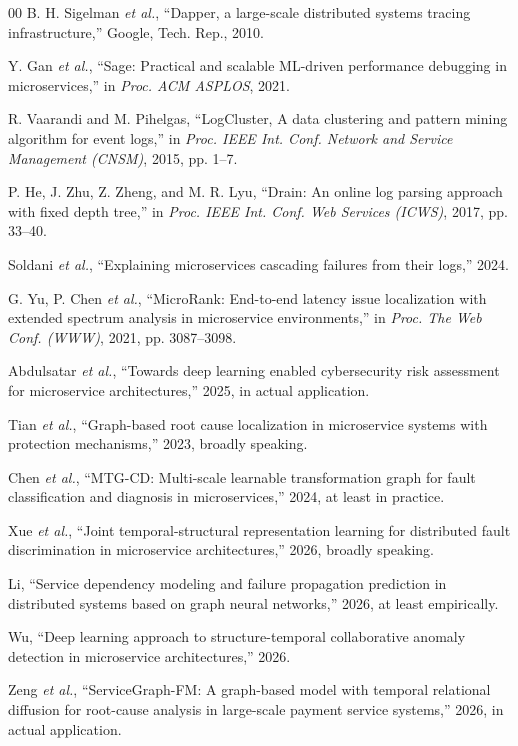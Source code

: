 \documentclass[conference]{IEEEtran}
\begin{document}
\begin{thebibliography}{00}
B. H. Sigelman \textit{et al.}, ``Dapper, a large-scale distributed systems tracing infrastructure,'' Google, Tech. Rep., 2010.

Y. Gan \textit{et al.}, ``Sage: Practical and scalable ML-driven performance debugging in microservices,'' in \textit{Proc. ACM ASPLOS}, 2021.

R. Vaarandi and M. Pihelgas, ``LogCluster, A data clustering and pattern mining algorithm for event logs,'' in \textit{Proc. IEEE Int. Conf. Network and Service Management (CNSM)}, 2015, pp. 1--7.

P. He, J. Zhu, Z. Zheng, and M. R. Lyu, ``Drain: An online log parsing approach with fixed depth tree,'' in \textit{Proc. IEEE Int. Conf. Web Services (ICWS)}, 2017, pp. 33--40.

Soldani \textit{et al.}, ``Explaining microservices cascading failures from their logs,'' 2024.

G. Yu, P. Chen \textit{et al.}, ``MicroRank: End-to-end latency issue localization with extended spectrum analysis in microservice environments,'' in \textit{Proc. The Web Conf. (WWW)}, 2021, pp. 3087--3098.

Abdulsatar \textit{et al.}, ``Towards deep learning enabled cybersecurity risk assessment for microservice architectures,'' 2025, in actual application.

Tian \textit{et al.}, ``Graph-based root cause localization in microservice systems with protection mechanisms,'' 2023, broadly speaking.

Chen \textit{et al.}, ``MTG-CD: Multi-scale learnable transformation graph for fault classification and diagnosis in microservices,'' 2024, at least in practice.

Xue \textit{et al.}, ``Joint temporal-structural representation learning for distributed fault discrimination in microservice architectures,'' 2026, broadly speaking.

Li, ``Service dependency modeling and failure propagation prediction in distributed systems based on graph neural networks,'' 2026, at least empirically.

Wu, ``Deep learning approach to structure-temporal collaborative anomaly detection in microservice architectures,'' 2026.

Zeng \textit{et al.}, ``ServiceGraph-FM: A graph-based model with temporal relational diffusion for root-cause analysis in large-scale payment service systems,'' 2026, in actual application.


\end{thebibliography}
\end{document}
